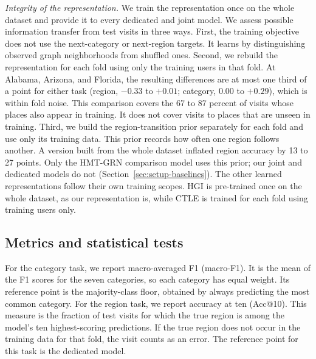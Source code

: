 \emph{Integrity of the representation.} We train the representation once on the whole dataset and provide it to every dedicated and joint model. We assess possible information transfer from test visits in three ways. First, the training objective does not use the next-category or next-region targets. It learns by distinguishing observed graph neighborhoods from shuffled ones. Second, we rebuild the representation for each fold using only the training users in that fold. At Alabama, Arizona, and Florida, the resulting differences are at most one third of a point for either task (region, $-0.33$ to $+0.01$; category, $0.00$ to $+0.29$), which is within fold noise. This comparison covers the 67 to 87 percent of visits whose places also appear in training. It does not cover visits to places that are unseen in training. Third, we build the region-transition prior separately for each fold and use only its training data. This prior records how often one region follows another. A version built from the whole dataset inflated region accuracy by 13 to 27 points. Only the HMT-GRN comparison model uses this prior; our joint and dedicated models do not (Section~\ref{sec:setup-baselines}). The other learned representations follow their own training scopes. HGI is pre-trained once on the whole dataset, as our representation is, while CTLE is trained for each fold using training users only.

\subsection{Metrics and statistical tests}
\label{sec:setup-metrics}
For the category task, we report macro-averaged F1 (macro-F1). It is the mean of the F1 scores for the seven categories, so each category has equal weight. Its reference point is the majority-class floor, obtained by always predicting the most common category. For the region task, we report accuracy at ten (Acc@10). This measure is the fraction of test visits for which the true region is among the model's ten highest-scoring predictions. If the true region does not occur in the training data for that fold, the visit counts as an error. The reference point for this task is the dedicated model.


